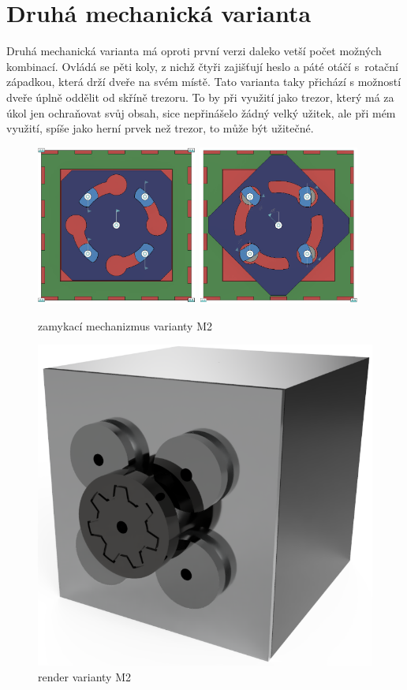 \section{Druhá mechanická varianta}

Druhá mechanická varianta má oproti první verzi daleko vetší počet možných kombinací.
Ovládá se pěti koly, z nichž čtyři zajišťují heslo a páté otáčí s~rotační západkou, která drží dveře na svém místě.
Tato varianta taky přichází s možností dveře úplně oddělit od skříně trezoru. To by při využití jako trezor, který
má za úkol jen ochraňovat svůj obsah, sice nepřinášelo žádný velký užitek, ale při mém využití, spíše jako herní 
prvek než trezor, to může být užitečné.

\begin{figure}[htbp]
    \centering
    \includegraphics[width=150pt]{kapitoly/obrazky/M2/mechanizmus_odemcen.png}
    \includegraphics[width=150pt]{kapitoly/obrazky/M2/mechanizmus_zamceno.png}
    \caption{zamykací mechanizmus varianty M2}
    \label{fig:M2-mechanizmus}
\end{figure}

\begin{figure}[htbp]
    \centering
    \includegraphics[width=\textwidth]{kapitoly/obrazky/M2/predni_render.PNG}
    \caption{render varianty M2}
    \label{fig:M1.0}
\end{figure}


\newpage